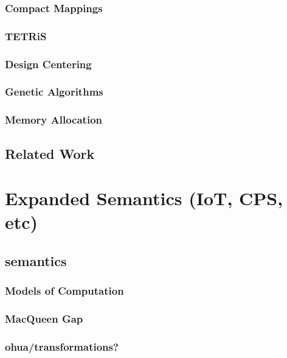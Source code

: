 \documentclass{report}
\begin{document}
\section{Compact Mappings}
\section{TETRiS}
\section{Design Centering}
\section{Genetic Algorithms}
\section{Memory Allocation}

\chapter{Related Work}



\part{Expanded Semantics (IoT, CPS, etc)}


\chapter{semantics}

\section{Models of Computation}

\section{MacQueen Gap}
\section{ohua/transformations?}
 
\end{document}
